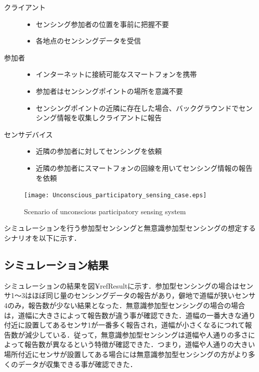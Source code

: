 \documentclass[submit,techrep]{ipsj}
\begin{document}
\begin{description}
 \item[クライアント]\mbox{}
    \begin{itemize}
      \item センシング参加者の位置を事前に把握不要
      \item 各地点のセンシングデータを受信\\
    \end{itemize}
 \item[参加者]\mbox{}
    \begin{itemize}
      \item インターネットに接続可能なスマートフォンを携帯
      \item 参加者はセンシングポイントの場所を意識不要
      \item センシングポイントの近隣に存在した場合、バックグラウンドでセンシング情報を収集しクライアントに報告\\
    \end{itemize}
 \item[センサデバイス]\mbox{}
    \begin{itemize}
      \item 近隣の参加者に対してセンシングを依頼
      \item 近隣の参加者にスマートフォンの回線を用いてセンシング情報の報告を依頼
    \end{itemize}
\end{description}


\begin{figure}[t]
 \begin{center}
  \texttt{[image: Unconscious\_participatory\_sensing\_case.eps]}
 \end{center}
 \caption{Scenario of unconscious participatory sensing system}
 \label{ScenarioUn}
\end{figure}


シミュレーションを行う参加型センシングと無意識参加型センシングの想定するシナリオを以下に示す．
\newpage
\subsection{シミュレーション結果}
シミュレーションの結果を図¥ref{Result}に示す．参加型センシングの場合はセンサ1〜3はほぼ同じ量のセンシングデータの報告があり，僻地で道幅が狭いセンサ4のみ，報告数が少ない結果となった．無意識参加型センシングの場合の場合は，道幅に大きさによって報告数が違う事が確認できた．道幅の一番大きな通り付近に設置してあるセンサ1が一番多く報告され，道幅が小さくなるにつれて報告数が減少している．従って，無意識参加型センシングは道幅や人通りの多さによって報告数が異なるという特徴が確認できた．つまり，道幅や人通りの大きい場所付近にセンサが設置してある場合には無意識参加型センシングの方がより多くのデータが収集できる事が確認できた．
\end{document}
